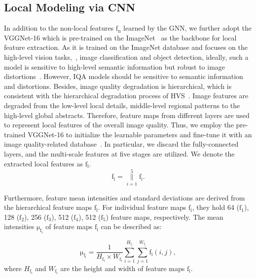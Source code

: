 \subsection{Local Modeling via CNN}
In addition to the non-local features $\boldsymbol{\mathrm{f_{n}}}$ learned by the GNN, we further adopt the VGGNet-16 which is pre-trained on the ImageNet~\citep{deng2009imagenet} as the backbone for local feature extraction. As it is trained on the ImageNet database and focuses on the high-level vision tasks,~\eg, image classification and object detection, ideally, such a model is sensitive to high-level semantic information but robust to image distortions~\citep{wu2020end}. However, IQA models should be sensitive to semantic information and distortions. Besides, image quality degradation is hierarchical, which is consistent with the hierarchical degradation process of HVS~\citep{wu2020end}. Image features are degraded from the low-level local details, middle-level regional patterns to the high-level global abstracts. Therefore, feature maps from different layers are used to represent local features of the overall image quality. Thus, we employ the pre-trained VGGNet-16 to initialize the learnable parameters and fine-tune it with an image quality-related database~\citep{dingIQA}. In particular, we discard the fully-connected layers, and the multi-scale features at five stages are utilized. We denote the extracted local features as $\boldsymbol{\mathrm{f_{l}}}$.
\begin{equation}
	\boldsymbol{\mathrm{f_{l}}}=\mathop{\|}\limits_{i=1}^{5} \boldsymbol{\mathrm{f_{i}}}.
\end{equation}

\indent Furthermore, feature mean intensities and standard deviations are derived from the hierarchical feature maps $\boldsymbol{\mathrm{f_{l}}}$. For individual feature maps $\boldsymbol{\mathrm{f_{i}}}$, they hold 64 ($\boldsymbol{\mathrm{f_{1}}}$), 128 ($\boldsymbol{\mathrm{f_{2}}}$), 256 ($\boldsymbol{\mathrm{f_{3}}}$), 512 ($\boldsymbol{\mathrm{f_{4}}}$), 512 ($\boldsymbol{\mathrm{f_{5}}}$) feature maps, respectively. The mean intensities $\boldsymbol{\mathrm\mu}_{\boldsymbol{\mathrm{f_{i}}}}$ of feature maps $\boldsymbol{\mathrm{f_{i}}}$ can be described as:

\begin{equation}
	\boldsymbol{\mathrm\mu}_{\boldsymbol{\mathrm{f_{i}}}}=\frac{1}{H_{\boldsymbol{\mathrm{f_{i}}}} \times W_{\boldsymbol{\mathrm{f_{i}}}}} \sum_{i=1}^{H_{\boldsymbol{\mathrm{f_{i}}}}} \sum_{j=1}^{W_{\boldsymbol{\mathrm{f_{i}}}}} \boldsymbol{\mathrm{f_{i}}}\left(i, j\right),
\end{equation}
where $H_{\boldsymbol{\mathrm{f_{i}}}}$ and $W_{\boldsymbol{\mathrm{f_{i}}}}$ are the height and width of feature maps $\boldsymbol{\mathrm{f_{i}}}$.

